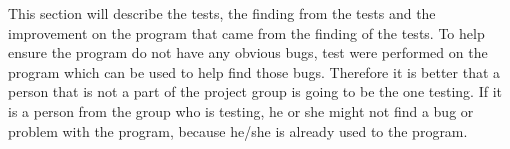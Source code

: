This section will describe the tests, the finding from the tests and the improvement on the program that came from the finding of the tests. To help ensure the program do not have any obvious bugs, test were performed on the program which can be used to help find those bugs. Therefore it is better that a person that is not a part of the project group is going to be the one testing. If it is a person from the group who is testing, he or she might not find a bug or problem with the program, because he/she is already used to the program. 